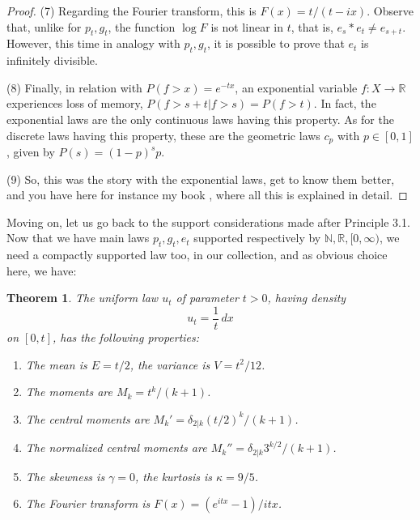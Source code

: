 \documentclass[12pt]{amsbook}
\newtheorem{theorem}{Theorem}[chapter]
\begin{document}
\begin{proof}
\medskip

(7) Regarding the Fourier transform, this is $F(x)=t/(t-ix)$. Observe that, unlike for $p_t,g_t$, the function $\log F$ is not linear in $t$, that is, $e_s*e_t\neq e_{s+t}$. However, this time in analogy with $p_t,g_t$, it is possible to prove that $e_t$ is infinitely divisible.

\medskip

(8) Finally, in relation with $P(f>x)=e^{-tx}$, an exponential variable $f:X\to\mathbb R$ experiences loss of memory, $P(f>s+t|f>s)=P(f>t)$. In fact, the exponential laws are the only continuous laws having this property. As for the discrete laws having this property, these are the geometric laws $c_p$ with $p\in[0,1]$, given by $P(s)=(1-p)^sp$.

\medskip

(9) So, this was the story with the exponential laws, get to know them better, and you have here for instance my book \cite{ba2}, where all this is explained in detail.
\end{proof}

Moving on, let us go back to the support considerations made after Principle 3.1. Now that we have main laws $p_t,g_t,e_t$ supported respectively by $\mathbb N,\mathbb R,[0,\infty)$, we need a compactly supported law too, in our collection, and as obvious choice here, we have:


\begin{theorem}
The uniform law $u_t$ of parameter $t>0$, having density
$$u_t=\frac{1}{t}\,dx$$
on $[0,t]$, has the following properties:
\begin{enumerate}
\item The mean is $E=t/2$, the variance is $V=t^2/12$.

\item The moments are $M_k=t^k/(k+1)$.

\item The central moments are $M_k'=\delta_{2|k}(t/2)^k/(k+1)$.

\item The normalized central moments are $M_k''=\delta_{2|k}3^{k/2}/(k+1)$.

\item The skewness is $\gamma=0$, the kurtosis is $\kappa=9/5$.

\item The Fourier transform is $F(x)=(e^{itx}-1)/itx$.
\end{enumerate}
\end{theorem}
\end{document}
